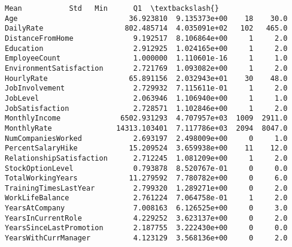 \documentclass[11pt]{article}
\makeatletter
\newcommand{\boxspacing}{\kern\kvtcb@left@rule\kern\kvtcb@boxsep}
\newcommand{\prompt}[4]{
        {\ttfamily\llap{{\color{#2}[#3]:\hspace{3pt}#4}}\vspace{-\baselineskip}}
    }
\makeatother
\begin{document}
            \begin{tcolorbox}[breakable, size=fbox, boxrule=.5pt, pad at break*=1mm, opacityfill=0]
\prompt{Out}{outcolor}{6}{\boxspacing}
\begin{Verbatim}[commandchars=\\\{\}]
                                  Mean           Std   Min      Q1  \textbackslash{}
Age                          36.923810  9.135373e+00    18    30.0
DailyRate                   802.485714  4.035091e+02   102   465.0
DistanceFromHome              9.192517  8.106864e+00     1     2.0
Education                     2.912925  1.024165e+00     1     2.0
EmployeeCount                 1.000000  1.110601e-16     1     1.0
EnvironmentSatisfaction       2.721769  1.093082e+00     1     2.0
HourlyRate                   65.891156  2.032943e+01    30    48.0
JobInvolvement                2.729932  7.115611e-01     1     2.0
JobLevel                      2.063946  1.106940e+00     1     1.0
JobSatisfaction               2.728571  1.102846e+00     1     2.0
MonthlyIncome              6502.931293  4.707957e+03  1009  2911.0
MonthlyRate               14313.103401  7.117786e+03  2094  8047.0
NumCompaniesWorked            2.693197  2.498009e+00     0     1.0
PercentSalaryHike            15.209524  3.659938e+00    11    12.0
RelationshipSatisfaction      2.712245  1.081209e+00     1     2.0
StockOptionLevel              0.793878  8.520767e-01     0     0.0
TotalWorkingYears            11.279592  7.780782e+00     0     6.0
TrainingTimesLastYear         2.799320  1.289271e+00     0     2.0
WorkLifeBalance               2.761224  7.064758e-01     1     2.0
YearsAtCompany                7.008163  6.126525e+00     0     3.0
YearsInCurrentRole            4.229252  3.623137e+00     0     2.0
YearsSinceLastPromotion       2.187755  3.222430e+00     0     0.0
YearsWithCurrManager          4.123129  3.568136e+00     0     2.0


\end{Verbatim}
\end{tcolorbox}
\end{document}
